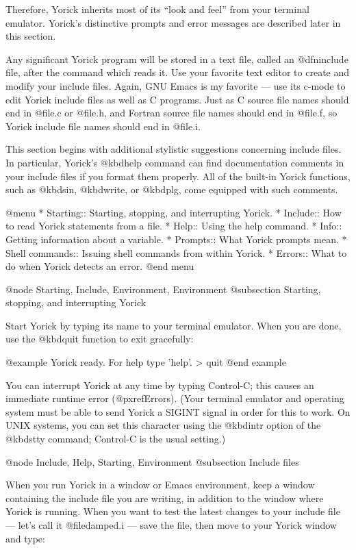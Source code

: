 {Therefore, Yorick inherits most of its ``look and feel'' from your
terminal emulator.  Yorick's distinctive prompts and error messages
are described later in this section.

Any significant Yorick program will be stored in a text file, called
an @dfn{include} file, after the command which reads it.  Use your
favorite text editor to create and modify your include files.  Again,
GNU Emacs is my favorite --- use its c-mode to edit Yorick include
files as well as C programs.  Just as C source file names should end
in @file{.c} or @file{.h}, and Fortran source file names should end in
@file{.f}, so Yorick include file names should end in @file{.i}.

This section begins with additional stylistic suggestions concerning
include files.  In particular, Yorick's @kbd{help} command can find
documentation comments in your include files if you format them
properly.  All of the built-in Yorick functions, such as @kbd{sin},
@kbd{write}, or @kbd{plg}, come equipped with such comments.


@menu
* Starting::                    Starting, stopping, and interrupting Yorick.
* Include::                     How to read Yorick statements from a file.
* Help::                        Using the help command.
* Info::                        Getting information about a variable.
* Prompts::                     What Yorick prompts mean.
* Shell commands::              Issuing shell commands from within Yorick.
* Errors::                      What to do when Yorick detects an error.
@end menu

@node Starting, Include, Environment, Environment
@subsection Starting, stopping, and interrupting Yorick

Start Yorick by typing its name to your terminal emulator.  When you
are done, use the @kbd{quit} function to exit gracefully:

@example
 Yorick ready.  For help type 'help'.
> quit
%
@end example

You can interrupt Yorick at any time by typing Control-C; this causes
an immediate runtime error (@pxref{Errors}).  (Your terminal emulator
and operating system must be able to send Yorick a SIGINT signal in
order for this to work.  On UNIX systems, you can set this character
using the @kbd{intr} option of the @kbd{stty} command; Control-C is the
usual setting.)


@node Include, Help, Starting, Environment
@subsection Include files

When you run Yorick in a window or Emacs environment, keep a window
containing the include file you are writing, in addition to the window
where Yorick is running.  When you want to test the latest changes to
your include file --- let's call it @file{damped.i} --- save the file,
then move to your Yorick window and type:

}
